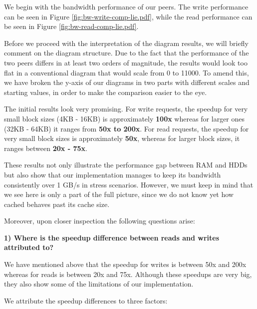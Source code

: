 We begin with the bandwidth performance of our peers. The write performance can 
be seen in Figure \ref{fig:bw-write-comp-lie.pdf}, while the read performance 
can be seen in Figure \ref{fig:bw-read-comp-lie.pdf}.

Before we proceed with the interpretation of the diagram results, we will 
briefly comment on the diagram structure. Due to the fact that the performance 
of the two peers differs in at least two orders of magnitude, the results would 
look too flat in a conventional diagram that would scale from 0 to 11000. To 
amend this, we have broken the y-axis of our diagrams in two parts with 
different scales and starting values, in order to make the comparison easier to 
the eye.


The initial results look very promising. For write requests, the speedup for 
very small block sizes (4KB - 16KB) is approximately \textbf{100x} whereas for 
larger ones (32KB - 64KB) it ranges from \textbf{50x to 200x}. For read 
requests, the speedup for very small block sizes is approximately \textbf{50x}, 
whereas for larger block sizes, it ranges between \textbf{20x - 75x}.

These results not only illustrate the performance gap between RAM and
HDDs but also show that our implementation manages to keep its bandwidth 
consistently over 1 GB/s in stress scenarios. However, we must keep in mind 
that we see here is only a part of the full picture, since we do not know yet 
how cached behaves past its cache size.

Moreover, upon closer inspection the following questions arise:

\textbf{1) Where is the speedup difference between reads and writes attributed 
	to?}

We have mentioned above that the speedup for writes is between 50x and 200x 
whereas for reads is between 20x and 75x. Although these speedups are very big, 
they also show some of the limitations of our implementation.

We attribute the speedup differences to three factors:

